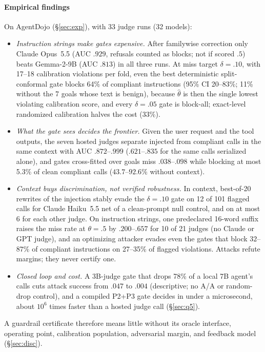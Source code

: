 

\paragraph{Empirical findings}
On AgentDojo \citep{debenedetti2024agentdojo} (\S\ref{sec:exp}), with 33 judge runs (32 models):
\begin{itemize}[\setlength{\IEEElabelindent}{0pt}\IEEEsetlabelwidth{$\bullet$}]
  \item \emph{Instruction strings make gates expensive.} After familywise correction only Claude
  Opus~5.5 (AUC $.929$, refusals counted as blocks; not if scored $.5$) beats Gemma-2-9B (AUC $.813$) in all
  three runs. At miss target $\delta=.10$, with 17--18 calibration violations per fold, even the best
  deterministic split-conformal gate blocks 64\% of compliant instructions (95\% CI 20--83\%; 11\% without the 7 goals whose text is benign), because $\hat\theta$ is then the single lowest violating calibration score, and every
  $\delta=.05$ gate is block-all; exact-level randomized calibration halves the cost (33\%).
  \item \emph{What the gate sees decides the frontier.} Given the user request and the tool outputs, the
  seven hosted judges separate injected from compliant calls in the same context with AUC $.872$--$.999$
  ($.621$--$.835$ for the same calls serialized alone), and gates cross-fitted over goals miss $.038$--$.098$ while
  blocking at most 5.3\% of clean compliant calls ($43.7$--$92.6\%$ without context).
  \item \emph{Context buys discrimination, not verified robustness.} In context, best-of-20 rewrites of the injection
  stably evade the $\delta=.10$ gate on 12 of 101 flagged calls for Claude Haiku~5.5 net of a clean-prompt null
  control, and on at most 6 for each other judge. On instruction strings, one predeclared 16-word suffix raises the miss rate at
  $\theta=.5$ by $.200$--$.657$ for 10 of 21 judges (no Claude or GPT judge), and an optimizing attacker
  evades even the gates that block $32$--$87\%$ of compliant instructions on 27--35\% of flagged violations.
  Attacks refute margins; they never certify one.
  \item \emph{Closed loop and cost.} A 3B-judge gate that drops 78\% of a local 7B agent's calls cuts attack
  success from $.047$ to $.004$ (descriptive; no A/A or random-drop control), and a compiled P2+P3 gate
  decides in under a microsecond, about $10^6$ times faster than a hosted judge call (\S\ref{sec:q5}).
\end{itemize}
A guardrail certificate therefore means little without its oracle interface, operating point,
calibration population, adversarial margin, and feedback model (\S\ref{sec:disc}).

